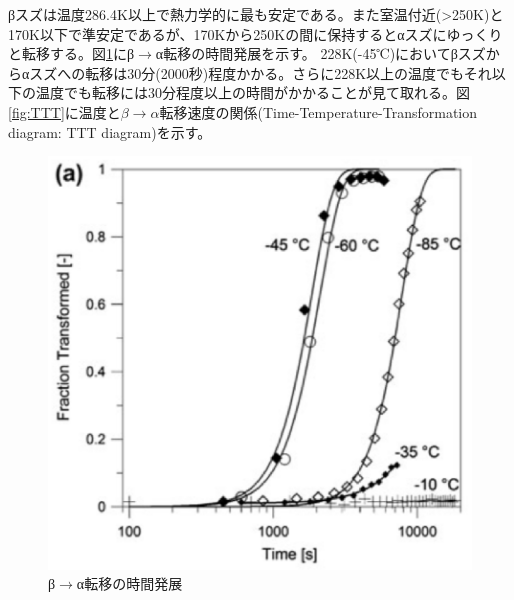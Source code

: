 βスズは温度286.4K以上で熱力学的に最も安定である。また室温付近(>250K)と170K以下で準安定であるが、170Kから250Kの間に保持するとαスズにゆっくりと転移する。図\ref{fig:beta-to-alpha}にβ$\to$α転移の時間発展を示す\cite{Nogita}。
228K(-45℃)においてβスズからαスズへの転移は30分(2000秒)程度かかる。さらに228K以上の温度でもそれ以下の温度でも転移には30分程度以上の時間がかかることが見て取れる。図\ref{fig:TTT}に温度と$\beta \to \alpha$転移速度の関係(Time-Temperature-Transformation diagram: TTT diagram)を示す。
\begin{figure}[!h]
 \begin{minipage}{0.5\hsize}
    \begin{center}
   \includegraphics[width=\hsize]{Introduction/beta-to-alpha.eps}
  \end{center}
  \caption{β$\to$α転移の時間発展\cite{Nogita}}
  \label{fig:beta-to-alpha}
 \end{minipage}
  \begin{minipage}{0.5\hsize}
     \begin{center}

\end{center}
\end{minipage}
\end{figure}
